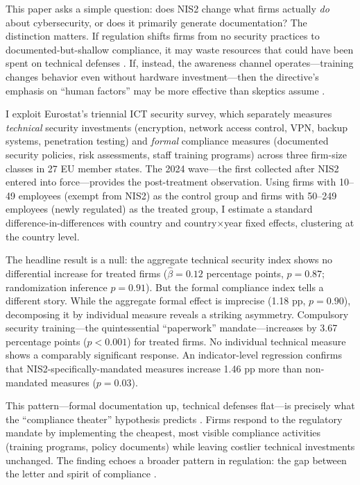 \documentclass[12pt]{article}
\begin{document}
This paper asks a simple question: does NIS2 change what firms actually \textit{do} about cybersecurity, or does it primarily generate documentation? The distinction matters. If regulation shifts firms from no security practices to documented-but-shallow compliance, it may waste resources that could have been spent on technical defenses \citep{gordon2002economics}. If, instead, the awareness channel operates---training changes behavior even without hardware investment---then the directive's emphasis on ``human factors'' may be more effective than skeptics assume \citep{anderson2001why}.

I exploit Eurostat's triennial ICT security survey, which separately measures \textit{technical} security investments (encryption, network access control, VPN, backup systems, penetration testing) and \textit{formal} compliance measures (documented security policies, risk assessments, staff training programs) across three firm-size classes in 27 EU member states. The 2024 wave---the first collected after NIS2 entered into force---provides the post-treatment observation. Using firms with 10--49 employees (exempt from NIS2) as the control group and firms with 50--249 employees (newly regulated) as the treated group, I estimate a standard difference-in-differences with country and country$\times$year fixed effects, clustering at the country level.

The headline result is a null: the aggregate technical security index shows no differential increase for treated firms ($\hat{\beta} = 0.12$ percentage points, $p = 0.87$; randomization inference $p = 0.91$). But the formal compliance index tells a different story. While the aggregate formal effect is imprecise (1.18 pp, $p = 0.90$), decomposing it by individual measure reveals a striking asymmetry. Compulsory security training---the quintessential ``paperwork'' mandate---increases by 3.67 percentage points ($p < 0.001$) for treated firms. No individual technical measure shows a comparably significant response. An indicator-level regression confirms that NIS2-specifically-mandated measures increase 1.46 pp more than non-mandated measures ($p = 0.03$).

This pattern---formal documentation up, technical defenses flat---is precisely what the ``compliance theater'' hypothesis predicts \citep{bandiera2009active}. Firms respond to the regulatory mandate by implementing the cheapest, most visible compliance activities (training programs, policy documents) while leaving costlier technical investments unchanged. The finding echoes a broader pattern in regulation: the gap between the letter and spirit of compliance \citep{bandiera2009active, stigler1971theory}.
\end{document}
